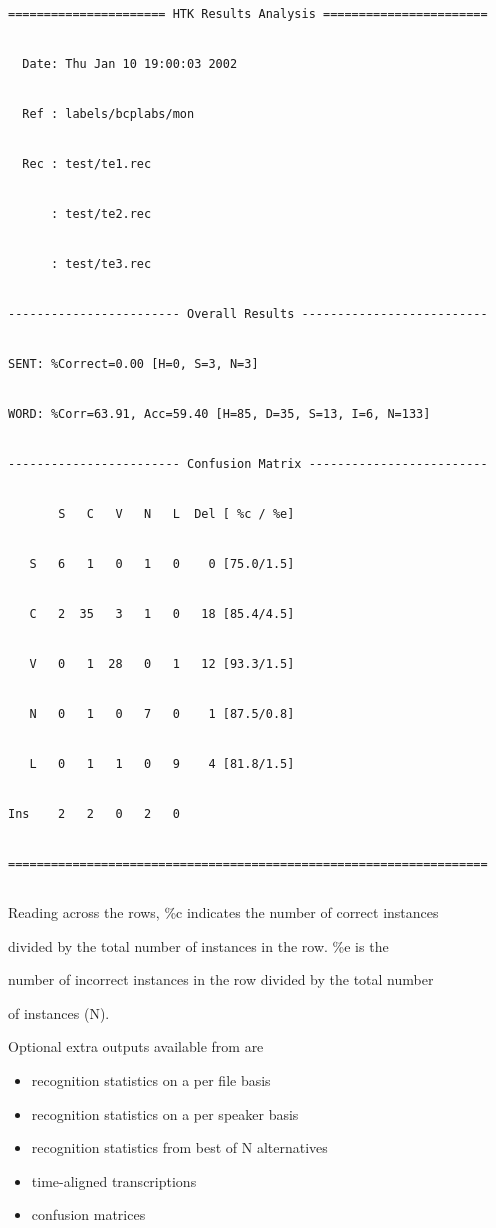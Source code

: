 \begin{verbatim}


====================== HTK Results Analysis =======================


  Date: Thu Jan 10 19:00:03 2002


  Ref : labels/bcplabs/mon


  Rec : test/te1.rec


      : test/te2.rec


      : test/te3.rec


------------------------ Overall Results --------------------------


SENT: %Correct=0.00 [H=0, S=3, N=3]


WORD: %Corr=63.91, Acc=59.40 [H=85, D=35, S=13, I=6, N=133]


------------------------ Confusion Matrix -------------------------


       S   C   V   N   L  Del [ %c / %e]


   S   6   1   0   1   0    0 [75.0/1.5]


   C   2  35   3   1   0   18 [85.4/4.5]


   V   0   1  28   0   1   12 [93.3/1.5]


   N   0   1   0   7   0    1 [87.5/0.8]


   L   0   1   1   0   9    4 [81.8/1.5]


Ins    2   2   0   2   0


===================================================================


\end{verbatim}


Reading across the rows, \%c indicates the number of correct instances


divided by the total number of instances in the row.  \%e is the


number of incorrect instances in the row divided by the total number


of instances (N).





Optional extra outputs available from  are


\begin{itemize}


 \item   recognition statistics on a per file basis


 \item   recognition statistics on a per speaker basis


 \item   recognition statistics from best of N alternatives


 \item   time-aligned transcriptions


 \item   confusion matrices


\end{itemize}



